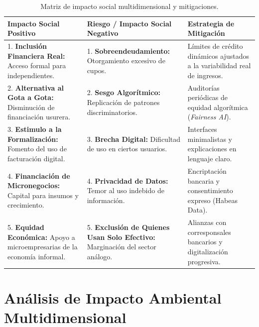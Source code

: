 \documentclass[11pt,a4paper]{article}
\begin{document}
\begin{table}[h!]
\centering
\tiny
\begin{tabular}{p{4.5cm} p{5.5cm} p{5.5cm}}
\toprule
\textbf{Impacto Social Positivo} & \textbf{Riesgo / Impacto Social Negativo} & \textbf{Estrategia de Mitigación} \\
\midrule
1. \textbf{Inclusión Financiera Real:} Acceso formal para independientes. & 1. \textbf{Sobreendeudamiento:} Otorgamiento excesivo de cupos. & Límites de crédito dinámicos ajustados a la variabilidad real de ingresos. \\
\midrule
2. \textbf{Alternativa al Gota a Gota:} Disminución de financiación usurera. & 2. \textbf{Sesgo Algorítmico:} Replicación de patrones discriminatorios. & Auditorías periódicas de equidad algorítmica (\textit{Fairness AI}). \\
\midrule
3. \textbf{Estimulo a la Formalización:} Fomento del uso de facturación digital. & 3. \textbf{Brecha Digital:} Dificultad de uso en ciertos usuarios. & Interfaces minimalistas y explicaciones en lenguaje claro. \\
\midrule
4. \textbf{Financiación de Micronegocios:} Capital para insumos y crecimiento. & 4. \textbf{Privacidad de Datos:} Temor al uso indebido de información. & Encriptación bancaria y consentimiento expreso (Habeas Data). \\
\midrule
5. \textbf{Equidad Económica:} Apoyo a microempresarias de la economía informal. & 5. \textbf{Exclusión de Quienes Usan Solo Efectivo:} Marginación del sector análogo. & Alianzas con corresponsales bancarios y digitalización progresiva. \\
\bottomrule
\end{tabular}
\caption{Matriz de impacto social multidimensional y mitigaciones.}
\end{table}

\section{Análisis de Impacto Ambiental Multidimensional}
\end{document}
